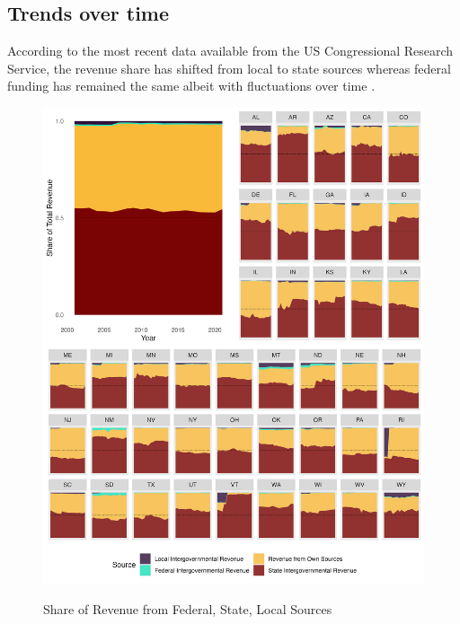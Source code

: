 \subsection{Trends over time}
According to the most recent data available from the US Congressional Research Service, the revenue share has shifted from local to state sources whereas federal funding has remained the same albeit with fluctuations over time \cite{skinnerStateLocalFinancing2019}.
\begin{figure}[ht]
    \caption{Share of Revenue from Federal, State, Local Sources \\
    }
    \centering
    \includegraphics[scale = 0.15]{../output/natl_shares_of_revenue_by_source.jpg}
    \label{fig:natl_share_rev}
\end{figure}
\FloatBarrier

